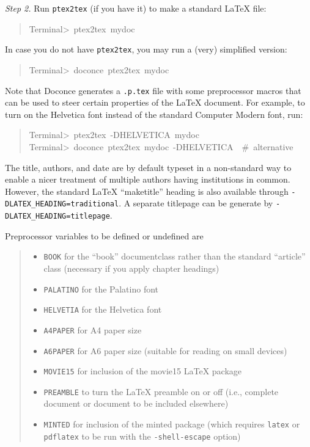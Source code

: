 \documentclass[a4paper]{article}
\begin{document}
\emph{Step 2.} Run \texttt{ptex2tex} (if you have it) to make a standard LaTeX file:
%
\begin{quote}{\ttfamily \raggedright \noindent
Terminal>~ptex2tex~mydoc
}
\end{quote}

In case you do not have \texttt{ptex2tex}, you may run a (very) simplified version:
%
\begin{quote}{\ttfamily \raggedright \noindent
Terminal>~doconce~ptex2tex~mydoc
}
\end{quote}

Note that Doconce generates a \texttt{.p.tex} file with some preprocessor macros
that can be used to steer certain properties of the LaTeX document.
For example, to turn on the Helvetica font instead of the standard
Computer Modern font, run:
%
\begin{quote}{\ttfamily \raggedright \noindent
Terminal>~ptex2tex~-DHELVETICA~mydoc\\
Terminal>~doconce~ptex2tex~mydoc~-DHELVETICA~~\#~alternative
}
\end{quote}

The title, authors, and date are by default typeset in a non-standard
way to enable a nicer treatment of multiple authors having
institutions in common. However, the standard LaTeX ``maketitle'' heading
is also available through \texttt{-DLATEX\_HEADING=traditional}.
A separate titlepage can be generate by
\texttt{-DLATEX\_HEADING=titlepage}.

Preprocessor variables to be defined or undefined are
%
\begin{quote}
%
\begin{itemize}

\item \texttt{BOOK} for the ``book'' documentclass rather than the standard
``article'' class (necessary if you apply chapter headings)

\item \texttt{PALATINO} for the Palatino font

\item \texttt{HELVETIA} for the Helvetica font

\item \texttt{A4PAPER} for A4 paper size

\item \texttt{A6PAPER} for A6 paper size (suitable for reading on small devices)

\item \texttt{MOVIE15} for inclusion of the movie15 LaTeX package

\item \texttt{PREAMBLE} to turn the LaTeX preamble on or off (i.e., complete document
or document to be included elsewhere)

\item \texttt{MINTED} for inclusion of the minted package (which requires \texttt{latex}
or \texttt{pdflatex} to be run with the \texttt{-shell-escape} option)

\end{itemize}

\end{quote}
\end{document}
